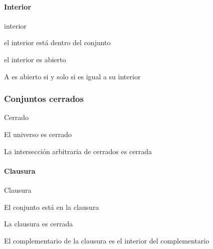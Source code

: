 \paragraph{Interior}

\begin{definition}
    interior
\end{definition}

\begin{proposition}
    el interior está dentro del conjunto
\end{proposition}

\begin{proposition}
    el interior es abierto
\end{proposition}

\begin{proposition}
    A es abierto si y solo si es igual a su interior
\end{proposition}

\subsubsection{Conjuntos cerrados}

\begin{definition}
    Cerrado
\end{definition}

\begin{example}
    El universo es cerrado
\end{example}

\begin{example}
    La intersección arbitraria de cerrados es cerrada
\end{example}

\paragraph{Clausura}

\begin{definition}
    Clausura
\end{definition}

\begin{proposition}
    El conjunto está en la clausura
\end{proposition}

\begin{proposition}
    La clausura es cerrada
\end{proposition}

\begin{proposition}
    El complementario de la clausura es el interior del complementario
\end{proposition}

